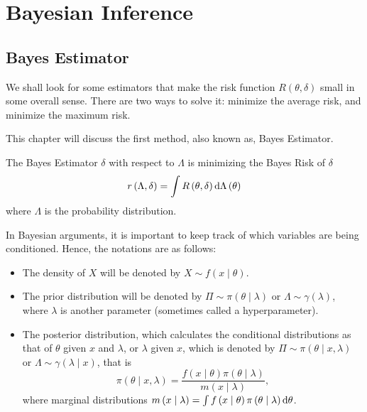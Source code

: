 \chapter{Bayesian Inference}

\section{Bayes Estimator}

We shall look for some estimators that make the risk function \(R\left(\theta,\delta\right)\) small in some overall sense. There are two ways to solve it: minimize the average risk, and minimize the maximum risk.

This chapter will discuss the first method, also known as, Bayes Estimator.

\begin{definition}\label{def:bayes-estimator}
	The Bayes Estimator \(\delta\) with respect to \(\Lambda\) is minimizing the Bayes Risk of \(\delta\)
	\begin{equation}
		r\left(\Lambda, \delta\right)=\int R\left(\theta, \delta\right) \mathop{}\!\mathrm{d} \Lambda\left(\theta\right)
	\end{equation}
	where \(\Lambda\) is the probability distribution.
\end{definition}

In Bayesian arguments, it is important to keep track of which variables are being conditioned. Hence, the notations are as follows:
\begin{itemize}
	\item The density of \(X\) will be denoted by \(X \sim f\left(x \mid \theta\right)\).
	\item The prior distribution will be denoted by \(\Pi \sim \pi\left(\theta \mid \lambda\right)\) or \(\Lambda \sim \gamma\left(\lambda\right)\), where \(\lambda\) is another parameter (sometimes called a hyperparameter).
	\item The posterior distribution, which calculates the conditional distributions as that of \(\theta\) given \(x\) and \(\lambda\), or \(\lambda\) given \(x\), which is denoted by \(\Pi \sim \pi\left(\theta \mid x, \lambda\right)\) or \(\Lambda \sim \gamma\left(\lambda \mid x\right)\), that is
	      \begin{equation}
		      \pi\left(\theta \mid x, \lambda\right) = \frac{f\left(x \mid \theta\right) \pi\left(\theta \mid \lambda\right)}{m\left(x \mid \lambda\right)},
	      \end{equation}
	      where marginal distributions \(m\left(x \mid \lambda\right) = \int f\left(x \mid \theta\right) \pi\left(\theta \mid \lambda\right) \mathop{}\!\mathrm{d} \theta\).
\end{itemize}

